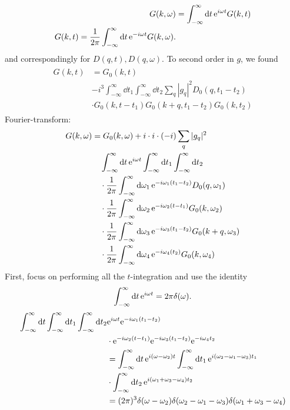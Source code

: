 \begin{align} 
G(k, \omega ) &= \int_{-\infty}^\infty \dd{t}\mathrm{e}^{i\omega t}G(k,t) \\
G(k, t ) = \frac{1}{2\pi}\int_{-\infty}^\infty \dd{t}\mathrm{e}^{-i\omega t}G(k,\omega).
\end{align}
and correspondingly for $D(q, t), D(q, \omega)$.
To second order in $g$, we found
\begin{align}
\begin{split}
G(k,t) &= G_0(k,t) \\&-i^3\int_{-\infty}^\infty\dd{t_1}\int_{-\infty}^\infty\dd{t_2}\sum_q|g_q|^2D_0(q, t_1-t_2)\\
&\cdot G_0(k, t-t_1)G_0(k+q, t_1-t_2)G_0(k,t_2)
\end{split} 
\end{align}
Fourier-transform:
\begin{align*}
	G(k,\omega) &= G_0(k,\omega) + i\cdot i \cdot(-i)\sum_q|g_q|^2 \\
	&\quad \int_{-\infty}^{\infty}\dd{t}\mathrm{e}^{i\omega t}\int_{-\infty}^\infty\dd{t_1}\int_{-\infty}^\infty\dd{t_2}\\
	& \quad \cdot \frac{1}{2\pi}\int_{-\infty}^{\infty}\dd{\omega_1}\mathrm{e}^{-i\omega_1(t_1-t_2)} D_0(q, \omega_1)\\
	& \quad \cdot \frac{1}{2\pi}\int_{-\infty}^{\infty}\dd{\omega_2}\mathrm{e}^{-i\omega_2(t-t_1)} G_0(k, \omega_2)  \\
	& \quad \cdot \frac{1}{2\pi}\int_{-\infty}^{\infty}\dd{\omega_3}\mathrm{e}^{-i\omega_3(t_1-t_2)} G_0(k + q, \omega_3)  \\
	& \quad \cdot \frac{1}{2\pi}\int_{-\infty}^{\infty}\dd{\omega_4}\mathrm{e}^{-i\omega_4(t_2)} G_0(k, \omega_4)  \\
\end{align*}
First, focus on performing all the $t$-integration and use the identity 
\begin{equation} 
\int_{-\infty}^{\infty}\dd{t}\mathrm{e}^{i\omega t} = 2\pi\delta(\omega).
\end{equation}
\begin{align*} 
 \int_{-\infty}^{\infty}\dd{t}\int_{-\infty}^\infty\dd{t_1}\int_{-\infty}^\infty\dd{t_2}&\mathrm{e}^{i\omega t}\mathrm{e}^{-i\omega_1(t_1-t_2)} \\ 
 &\cdot \mathrm{e}^{-i\omega_2(t-t_1)}\mathrm{e}^{-i\omega_3(t_1-t_2)}\mathrm{e}^{-i\omega_4 t_2} \\
 &= \int_{-\infty}^\infty \dd{t}\mathrm{e}^{i(\omega-\omega_2)t}\int_{-\infty}^\infty \dd{t_1}\mathrm{e}^{i(\omega_2-\omega_1-\omega_3)t_1} \\
 &\cdot \int_{-\infty}^\infty \dd{t_2}\mathrm{e}^{i(\omega_1+\omega_3 - \omega_4)t_2} \\
 &= (2\pi)^3\delta(\omega-\omega_2)\delta(\omega_2-\omega_1-\omega_3)\delta(\omega_1+\omega_3-\omega_4)
\end{align*}
